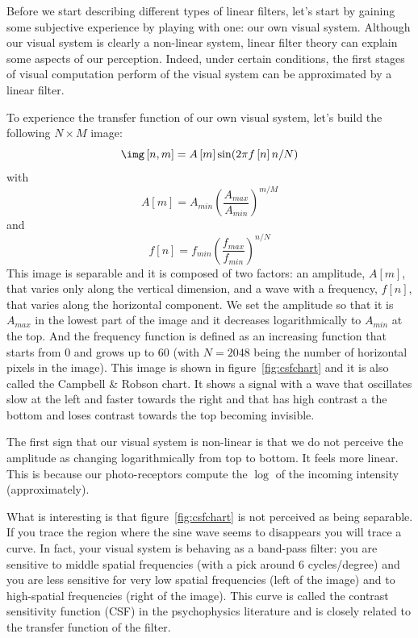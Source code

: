 Before we start describing different types of linear filters, let's start by gaining some subjective experience by playing with one: our own visual system. Although our visual system is clearly a non-linear system, linear filter theory can explain some aspects of our perception. Indeed, under certain conditions, the first stages of visual computation perform of the visual system can be approximated by a linear filter.

To experience the transfer function of our own visual system, let's build the following $N \times M$ image:
\begin{equation}
	\img \left[n,m\right] = A\left[m\right] \sin(2 \pi f\left[n\right] n/N)
\end{equation}
with
\begin{equation}
	A\left[m\right] = A_{min} \left(\frac{A_{max}}{A_{min}}\right)^{m/M}
\end{equation}
and
\begin{equation}
	f\left[n\right] = f_{min} \left(\frac{f_{max}}{f_{min}}\right)^{n/N}
\end{equation}
This image is separable and it is composed of two factors: an amplitude, $A\left[m\right]$, that varies only along the vertical dimension, and a wave with a frequency, $f\left[n\right]$, that varies along the horizontal component. We set the amplitude so that it is $A_{max}$ in the lowest part of the image and it decreases logarithmically to $A_{min}$ at the top. And the frequency function is defined as an increasing function that starts from 0 and grows up to 60 (with $N=2048$ being the number of horizontal pixels in the image). This image is shown in figure~\ref{fig:csfchart} and it is also called the Campbell \& Robson chart. It shows a signal with a wave that oscillates slow at the left and faster towards the right and that has high contrast a the bottom and loses contrast towards the top becoming invisible.

The first sign that our visual system is non-linear is that we do not perceive the amplitude as changing logarithmically from top to bottom. It feels more linear. This is because our photo-receptors compute the $\log$ of the incoming intensity (approximately).

What is interesting is that figure~\ref{fig:csfchart} is not perceived as being separable. If you trace the region where the sine wave seems to disappears you will trace a curve. In fact, your visual system is behaving as a band-pass filter: you are sensitive to middle spatial frequencies (with a pick around 6 cycles/degree) and you are less sensitive for very low spatial frequencies (left of the image) and to high-spatial frequencies (right of the image). This curve is called the contrast sensitivity function (CSF) in the psychophysics literature and is closely related to the transfer function of the filter.

